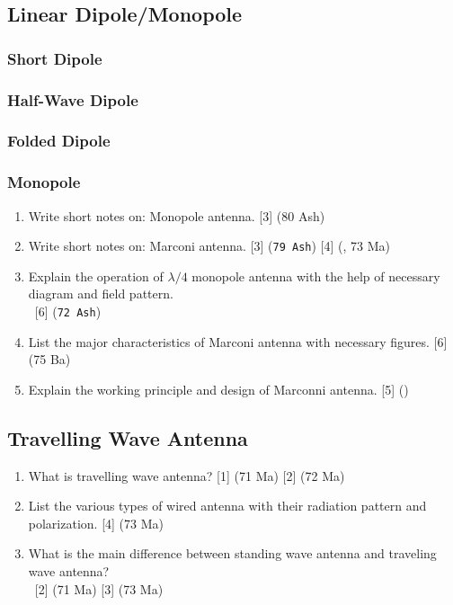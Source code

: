 \documentclass[12pt]{article}
\newcommand{\enter}{\\\textcolor{white}{1}}
\begin{document}
  \subsection{Linear Dipole/Monopole}
    \subsubsection{Short Dipole}
    \subsubsection{Half-Wave Dipole}
    \subsubsection{Folded Dipole}
    \subsubsection{Monopole}
      \begin{enumerate}
        \item Write short notes on: Monopole antenna. \hfill [3] (80 Ash)

        \item Write short notes on: Marconi antenna. \hfill [3] (\texttt{79 Ash}) [4] (, 73 Ma)

        \item Explain the operation of $\lambda/4$ monopole antenna with the help of necessary diagram and field pattern.
          \enter\hfill [6] (\texttt{72 Ash})

        \item List the major characteristics of Marconi antenna with necessary figures. \hfill [6] (75 Ba)

        \item Explain the working principle and design of Marconni antenna. \hfill [5] ()
      \end{enumerate}  

  \subsection{Travelling Wave Antenna}
    \begin{enumerate}
      \item What is travelling wave antenna? \hfill [1] (71 Ma) [2] (72 Ma)

      \item List the various types of wired antenna with their radiation pattern and polarization. \hfill [4] (73 Ma)

      \item What is the main difference between standing wave antenna and traveling wave antenna?
        \enter\hfill [2] (71 Ma) [3] (73 Ma)
    \end{enumerate}
\end{document}
